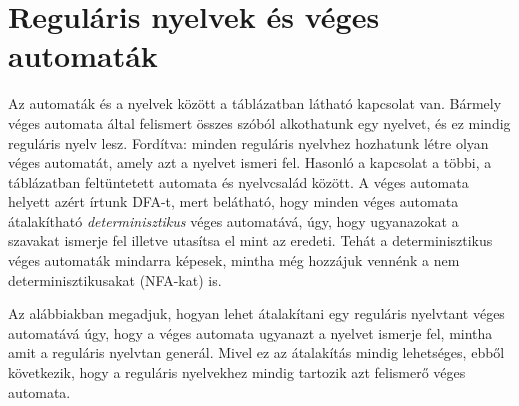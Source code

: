 \documentclass[a4paper]{article}
\begin{document}
\section{Reguláris nyelvek és véges automaták}

Az automaták és a nyelvek között a táblázatban látható kapcsolat van.
Bármely véges automata által felismert összes szóból alkothatunk egy
nyelvet, és ez mindig reguláris nyelv lesz. Fordítva: minden reguláris
nyelvhez hozhatunk létre olyan véges automatát, amely azt a nyelvet
ismeri fel. Hasonló a kapcsolat a többi, a táblázatban feltüntetett
automata és nyelvcsalád között. A véges automata helyett azért írtunk
DFA-t, mert belátható, hogy minden véges automata átalakítható
\emph{determinisztikus} véges automatává, úgy, hogy ugyanazokat a
szavakat ismerje fel illetve utasítsa el mint az eredeti. Tehát a
determinisztikus véges automaták mindarra képesek, mintha még hozzájuk
vennénk a nem determinisztikusakat (NFA-kat) is.

Az alábbiakban megadjuk, hogyan lehet átalakítani egy reguláris
nyelvtant véges automatává úgy, hogy a véges automata ugyanazt a nyelvet
ismerje fel, mintha amit a reguláris nyelvtan generál. Mivel ez az
átalakítás mindig lehetséges, ebből következik, hogy a reguláris
nyelvekhez mindig tartozik azt felismerő véges automata.
\end{document}

